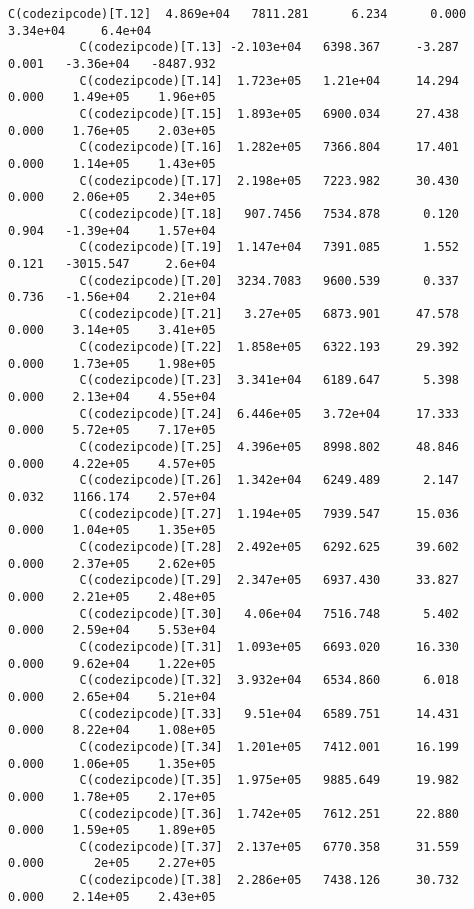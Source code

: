 \documentclass[11pt]{article}
\begin{document}
\begin{Verbatim}[commandchars=\\\{\}]
          C(codezipcode)[T.12]  4.869e+04   7811.281      6.234      0.000    3.34e+04     6.4e+04
          C(codezipcode)[T.13] -2.103e+04   6398.367     -3.287      0.001   -3.36e+04   -8487.932
          C(codezipcode)[T.14]  1.723e+05   1.21e+04     14.294      0.000    1.49e+05    1.96e+05
          C(codezipcode)[T.15]  1.893e+05   6900.034     27.438      0.000    1.76e+05    2.03e+05
          C(codezipcode)[T.16]  1.282e+05   7366.804     17.401      0.000    1.14e+05    1.43e+05
          C(codezipcode)[T.17]  2.198e+05   7223.982     30.430      0.000    2.06e+05    2.34e+05
          C(codezipcode)[T.18]   907.7456   7534.878      0.120      0.904   -1.39e+04    1.57e+04
          C(codezipcode)[T.19]  1.147e+04   7391.085      1.552      0.121   -3015.547     2.6e+04
          C(codezipcode)[T.20]  3234.7083   9600.539      0.337      0.736   -1.56e+04    2.21e+04
          C(codezipcode)[T.21]   3.27e+05   6873.901     47.578      0.000    3.14e+05    3.41e+05
          C(codezipcode)[T.22]  1.858e+05   6322.193     29.392      0.000    1.73e+05    1.98e+05
          C(codezipcode)[T.23]  3.341e+04   6189.647      5.398      0.000    2.13e+04    4.55e+04
          C(codezipcode)[T.24]  6.446e+05   3.72e+04     17.333      0.000    5.72e+05    7.17e+05
          C(codezipcode)[T.25]  4.396e+05   8998.802     48.846      0.000    4.22e+05    4.57e+05
          C(codezipcode)[T.26]  1.342e+04   6249.489      2.147      0.032    1166.174    2.57e+04
          C(codezipcode)[T.27]  1.194e+05   7939.547     15.036      0.000    1.04e+05    1.35e+05
          C(codezipcode)[T.28]  2.492e+05   6292.625     39.602      0.000    2.37e+05    2.62e+05
          C(codezipcode)[T.29]  2.347e+05   6937.430     33.827      0.000    2.21e+05    2.48e+05
          C(codezipcode)[T.30]   4.06e+04   7516.748      5.402      0.000    2.59e+04    5.53e+04
          C(codezipcode)[T.31]  1.093e+05   6693.020     16.330      0.000    9.62e+04    1.22e+05
          C(codezipcode)[T.32]  3.932e+04   6534.860      6.018      0.000    2.65e+04    5.21e+04
          C(codezipcode)[T.33]   9.51e+04   6589.751     14.431      0.000    8.22e+04    1.08e+05
          C(codezipcode)[T.34]  1.201e+05   7412.001     16.199      0.000    1.06e+05    1.35e+05
          C(codezipcode)[T.35]  1.975e+05   9885.649     19.982      0.000    1.78e+05    2.17e+05
          C(codezipcode)[T.36]  1.742e+05   7612.251     22.880      0.000    1.59e+05    1.89e+05
          C(codezipcode)[T.37]  2.137e+05   6770.358     31.559      0.000       2e+05    2.27e+05
          C(codezipcode)[T.38]  2.286e+05   7438.126     30.732      0.000    2.14e+05    2.43e+05

\end{Verbatim}
\end{document}
